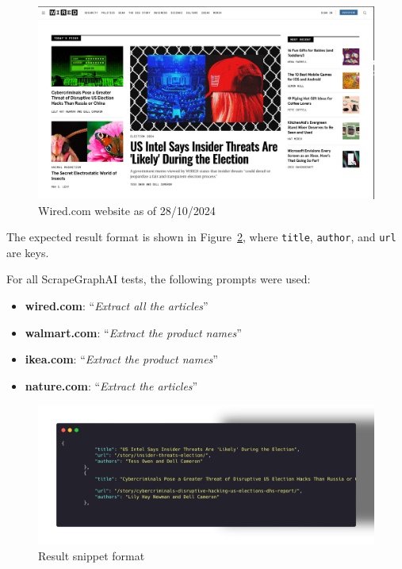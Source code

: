 \begin{figure}[H]
    \centering
    \includegraphics[width=0.95\linewidth]{Assets/wired.png}
    \caption{Wired.com website as of 28/10/2024}
    \label{fig:enter-label}
\end{figure}

The expected result format is shown in Figure~\ref{fig:res-snippet}, where \texttt{title}, \texttt{author}, and \texttt{url} are keys.

For all ScrapeGraphAI tests, the following prompts were used:

\begin{itemize}
    \item \textbf{wired.com}: ``\textit{Extract all the articles}''
    \item \textbf{walmart.com}: ``\textit{Extract the product names}''
    \item \textbf{ikea.com}: ``\textit{Extract the product names}''
    \item \textbf{nature.com}: ``\textit{Extract the articles}''
\end{itemize}

\begin{figure}[H]
    \centering
    \includegraphics[width=0.95\linewidth]{Assets/result.png}
    \caption{Result snippet format}
    \label{fig:res-snippet}
\end{figure}

